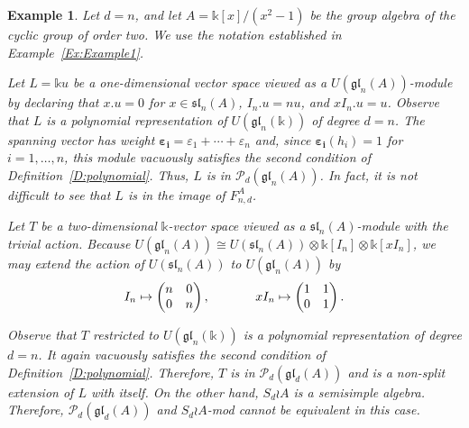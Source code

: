 \documentclass[11pt,reqno]{amsart} %
\newtheorem{example}[theorem]{Example}
\newcommand{\gl}{\mathfrak{gl}}
\renewcommand{\k}{\mathds{k}}
\newcommand{\0}{\bar{0}}
\newcommand{\1}{\bar{1}}
\newcommand{\wreath}{\wr}
\newcommand{\SdwreathA}{S_{d} \wreath A}
\newcommand{\bi}{\mathbf{i}}
\newcommand{\bepsilon}{\boldsymbol{\varepsilon}}
\newcommand{\Pol}{\mathcal{P}}
\numberwithin{equation}{subsection}
\begin{document}



\begin{example}\label{Ex:Example2}  Let $d=n$, and let $A= \k[x]/(x^{2}-1)$ be the group algebra of the cyclic group of order two.  We use the notation established in Example~\ref{Ex:Example1}.    


Let $L= \k u$ be a one-dimensional vector space viewed as a $U(\gl_{n}(A))$-module by declaring that  $x.u=0$ for $x \in \mathfrak{sl}_{n}(A)$, $I_{n}.u=nu$, and $xI_{n}. u= u$.
Observe that $L$ is a polynomial representation of $U(\gl_{n}(\k ))$ of degree $d=n$.  The spanning vector has weight $\bepsilon_{\bi}=\varepsilon_{1}+\dotsb +\varepsilon_{n}$ and, since $\bepsilon_{\bi}(h_{i}) = 1$ for $i=1, \dotsc , n$, this module vacuously satisfies the second condition of Definition~\ref{D:polynomial}. Thus, $L$ is in $\Pol_{d}(\gl_{n}(A))$.  In fact, it is not difficult to see that $L$ is in the image of $F^{A}_{n,d}$.


Let $T$ be a two-dimensional $\k$-vector space viewed as a $\mathfrak{sl}_{n}(A)$-module with the trivial action.  Because $U(\gl_{n}(A)) \cong U(\mathfrak{sl}_{n}(A)) \otimes \k[I_{n}] \otimes \k [xI_{n}]$, we may extend the action of $U(\mathfrak{sl}_{n}(A))$ to $U(\gl_{n}(A))$  by
\[
I_{n} \mapsto \left( \begin{matrix}
n   & 0     \\
0   & n  
\end{matrix}\right),
\hspace{0.5in}
xI_{n} \mapsto \left( \begin{matrix}
1   & 1     \\
0   &   1
\end{matrix}\right).
\]

Observe that $T$ restricted to $U(\gl_{n}(\k))$ is a polynomial representation of degree $d=n$.  It again vacuously satisfies the second condition of Definition~\ref{D:polynomial}. Therefore, $T$ is in $\Pol_{d}(\gl_{d}(A))$ and is a non-split extension of $L$ with itself.  On the other hand, $\SdwreathA$ is a semisimple algebra.  Therefore, $\Pol_{d}(\gl_{d}(A))$ and $\SdwreathA$-mod cannot be equivalent in this case.
\end{example}
\end{document}
